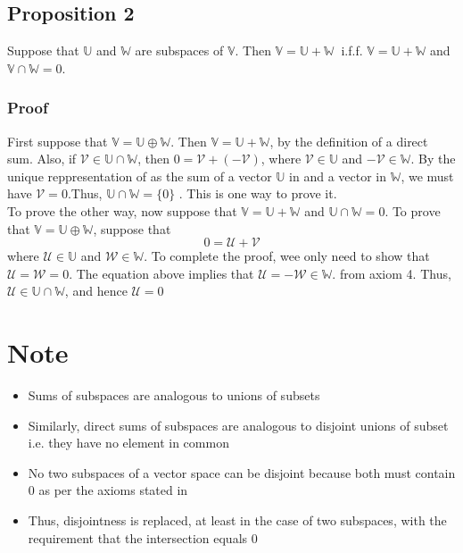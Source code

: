 \subsection{Proposition 2}
Suppose that $\mathbb{U}$ and $\mathbb{W}$ are subspaces of $\mathbb{V}$. Then $\mathbb{V} = \mathbb{U} + \mathbb{W} \ $ i.f.f. $\mathbb{V} = \mathbb{U} + \mathbb{W}$ and $\mathbb{V} \cap \mathbb{W} = 0$.
\subsubsection{Proof}
First suppose that $\mathbb{V} = \mathbb{U} \oplus \mathbb{W}$. Then $\mathbb{V} = \mathbb{U} + \mathbb{W}$, by the definition of a direct sum. Also, if $\mathcal{V} \in \mathbb{U} \cap \mathbb{W}$, then $0 = \mathcal{V} + (-\mathcal{V})$, where $\mathcal{V} \in \mathbb{U}$ and $-\mathcal{V} \in \mathbb{W}$. By the unique reppresentation of  as the sum of a vector $\mathbb{U}$ in and a vector in $\mathbb{W}$, we must have $\mathcal{V} = 0$.Thus, $\mathbb{U} \cap \mathbb{W} = \{0\}$ . This is one way to prove it. \\

To prove the other way, now suppose that $\mathbb{V} = \mathbb{U} + \mathbb{W}$ and $\mathbb{U} \cap \mathbb{W} = {0}$. To prove that $\mathbb{V} = \mathbb{U} \oplus \mathbb{W}$, suppose that 
$$0 = \mathcal{U} + \mathcal{V}$$
where $\mathcal{U} \in \mathbb{U}$ and $\mathcal{W} \in \mathbb{W}$. To complete the proof, wee only need to show that $\mathcal{U} = \mathcal{W} = 0$. The equation above implies that $\mathcal{U} = - \mathcal{W} \in \mathbb{W}.$ from axiom 4. Thus, $\mathcal{U} \in \mathbb{U} \cap \mathbb{W}$, and hence $\mathcal{U} = 0$
\section{Note}
\begin{itemize}
	\item Sums of subspaces are analogous to unions of subsets
	\item Similarly, direct sums of subspaces are analogous to disjoint unions of subset i.e. they have no element in common
	\item No two subspaces of a vector space can be disjoint because both must contain $0$ as per the axioms stated in 
	\item Thus, disjointness is replaced, at least in the case of two subspaces, with the requirement that the intersection equals ${0}$
\end{itemize}